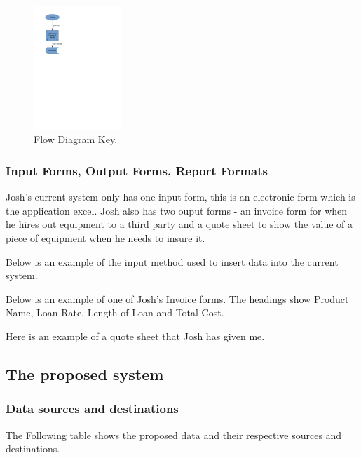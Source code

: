 \documentclass[a4paper,12pt]{report}
\begin{document}
\begin{figure}[H]
    \caption{Flow Diagram Key.} \label{fig:print_function_result}
    \includegraphics[width=125px]{./Dataflow/DFD_analysis_update_item.pdf}
\end{figure}

\newpage

\subsubsection{Input Forms, Output Forms, Report Formats}

Josh's current system only has one input form, this is an electronic form which is the application excel. Josh also has two ouput forms - an invoice form for when he hires out equipment to a third party and a quote sheet to show the value of a piece of equipment when he needs to insure it.

Below is an example of the input method used to insert data into the current system.




Below is an example of one of Josh's Invoice forms. The headings show Product Name, Loan Rate, Length of Loan and Total Cost.

Here is an example of a quote sheet that Josh has given me.

\newpage

\subsection{The proposed system}

\subsubsection{Data sources and destinations}

The Following table shows the proposed data and their respective sources and destinations.
\end{document}
